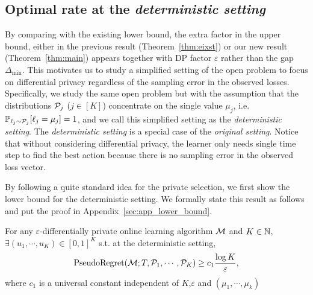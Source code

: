 \subsection{Optimal rate at the \textit{deterministic setting}}
\label{sec:result_det}
By comparing with the existing lower bound, the extra factor in the upper bound, either in the previous result (Theorem~\ref{thm:eixst}) or our new result (Theorem~\ref{thm:main}) appears together with DP factor $\varepsilon$ rather than the gap $\Delta_{\min}$.
This motivates us to study a simplified setting of the open problem to focus on differential privacy regardless of the sampling error in the observed losses.
Specifically, we study the same open problem but with the assumption that the distributions $\mathcal{P}_j$ ($j\in [K]$) concentrate on the single value $\mu_j$, i.e. $\mathbb{P}_{\ell_j\sim \mathcal{P}_j}[\ell_j=\mu_j] = 1$, and we call this simplified setting as the \textit{deterministic setting}.
The \textit{deterministic setting} is a special case of the \textit{original setting}.
Notice that without considering differential privacy, the learner only needs single time step to find the best action because there is no sampling error in the observed loss vector.

By following a quite standard idea for the private selection, we first show the lower bound for the deterministic setting. 
We formally state this result as follows and put the proof in Appendix~\ref{sec:app_lower_bound}.
\begin{theorem}
\label{thm:lower_det}
	For any $\varepsilon$-differentially private online learning algorithm $\mathcal{M}$ and $K\in \mathbb{N}$, $\exists (u_1, \cdots, u_K)\in [0, 1]^{K}$ s.t. at the deterministic setting,
	$$\mathrm{PseudoRegret}(\mathcal{M}; T, \mathcal{P}_1, \cdots, \mathcal{P}_K) \geq c_1\frac{\log K}{\varepsilon},$$
	where $c_1$ is a universal constant independent of $K$,$\varepsilon$ and $(\mu_1, \cdots, \mu_k)$
\end{theorem}


